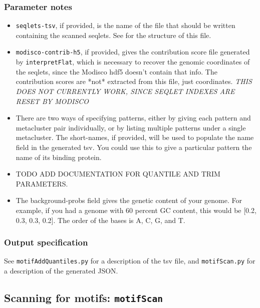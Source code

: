 \documentclass{article}
\begin{document}
\subsubsection{Parameter notes}
\begin{itemize}
    \item \texttt{seqlets-tsv}, if provided, is the name of the file that should
        be written containing the scanned seqlets.
        See  for the structure of this file.
    \item \texttt{modisco-contrib-h5}, if provided, gives the contribution score
        file generated by \texttt{interpretFlat}, which is necessary to recover
        the genomic coordinates of the seqlets, since the Modisco hdf5 doesn't
        contain that info.
        The contribution scores are *not* extracted from this file, just
        coordinates.
        \emph{THIS DOES NOT CURRENTLY WORK, SINCE SEQLET INDEXES ARE RESET BY
        MODISCO}
    \item There are two ways of specifying patterns, either by giving each
        pattern and metacluster pair individually, or by listing multiple
        patterns under a single metacluster.
        The short-names, if provided, will be used to populate the name field in
        the generated tsv.
        You could use this to give a particular pattern the name of its binding
        protein.
    \item TODO ADD DOCUMENTATION FOR QUANTILE AND TRIM PARAMETERS.
    \item The background-probs field gives the genetic content of your genome.
        For example, if you had a genome with 60 percent GC content, this would
        be [0.2, 0.3, 0.3, 0.2].
        The order of the bases is A, C, G, and T.
\end{itemize}

\subsubsection{Output specification}
See \texttt{motifAddQuantiles.py} for a description of the tsv file,
and \texttt{motifScan.py} for a description of the generated JSON.


\newpage


\subsection{Scanning for motifs: \texttt{motifScan}}\label{prog:motifScan}
\end{document}
